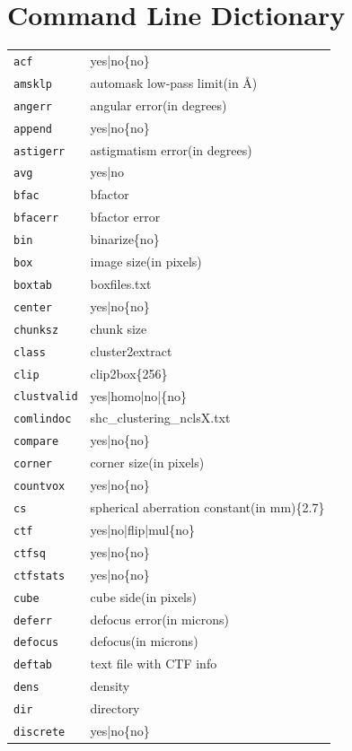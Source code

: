 \documentclass[a4paper,11pt]{article}
\begin{document}
\section{Command Line Dictionary}
\begin{tabular}{ll}
\texttt{acf}&{yes|no\{no\}}\\
\texttt{amsklp}&{automask low-pass limit(in \AA{})}\\
\texttt{angerr}&{angular error(in degrees)}\\
\texttt{append}&{yes|no\{no\}}\\
\texttt{astigerr}&{astigmatism error(in degrees)}\\
\texttt{avg}&{yes|no}\\
\texttt{bfac}&{bfactor}\\
\texttt{bfacerr}&{bfactor error}\\
\texttt{bin}&{binarize\{no\}}\\
\texttt{box}&{image size(in pixels)}\\
\texttt{boxtab}&{boxfiles.txt}\\
\texttt{center}&{yes|no\{no\}}\\
\texttt{chunksz}&{chunk size}\\
\texttt{class}&{cluster2extract}\\
\texttt{clip}&{clip2box\{256\}}\\
\texttt{clustvalid}&{yes|homo|no|\{no\}}\\
\texttt{comlindoc}&{shc\_clustering\_nclsX.txt}\\
\texttt{compare}&{yes|no\{no\}}\\
\texttt{corner}&{corner size(in pixels)}\\
\texttt{countvox}&{yes|no\{no\}}\\
\texttt{cs}&{spherical aberration constant(in mm)\{2.7\}}\\
\texttt{ctf}&{yes|no|flip|mul\{no\}}\\
\texttt{ctfsq}&{yes|no\{no\}}\\
\texttt{ctfstats}&{yes|no\{no\}}\\
\texttt{cube}&{cube side(in pixels)}\\
\texttt{deferr}&{defocus error(in microns)}\\
\texttt{defocus}&{defocus(in microns)}\\
\texttt{deftab}&{text file with CTF info}\\
\texttt{dens}&{density}\\
\texttt{dir}&{directory}\\
\texttt{discrete}&{yes|no\{no\}}\\

\end{tabular}
\end{document}
